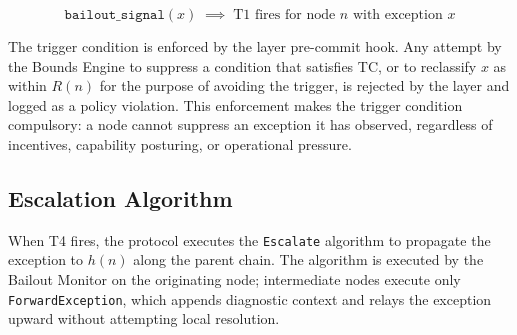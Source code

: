 \begin{equation}
\texttt{bailout\_signal}(x) \;\implies\; \text{T1 fires for node } n \text{ with exception } x \tag{TC-secondary}
\end{equation}

The trigger condition is enforced by the \fact{} layer pre-commit hook. Any attempt by the Bounds Engine to suppress a condition that satisfies TC, or to reclassify $x$ as within $R(n)$ for the purpose of avoiding the trigger, is rejected by the \fact{} layer and logged as a policy violation. This enforcement makes the trigger condition compulsory: a \bxthree{} node cannot suppress an exception it has observed, regardless of incentives, capability posturing, or operational pressure.

\subsection{Escalation Algorithm}\label{sec:escalation-algorithm}

When T4 fires, the protocol executes the \texttt{Escalate} algorithm to propagate the exception to $h(n)$ along the parent chain. The algorithm is executed by the Bailout Monitor on the originating node; intermediate nodes execute only \texttt{ForwardException}, which appends diagnostic context and relays the exception upward without attempting local resolution.

